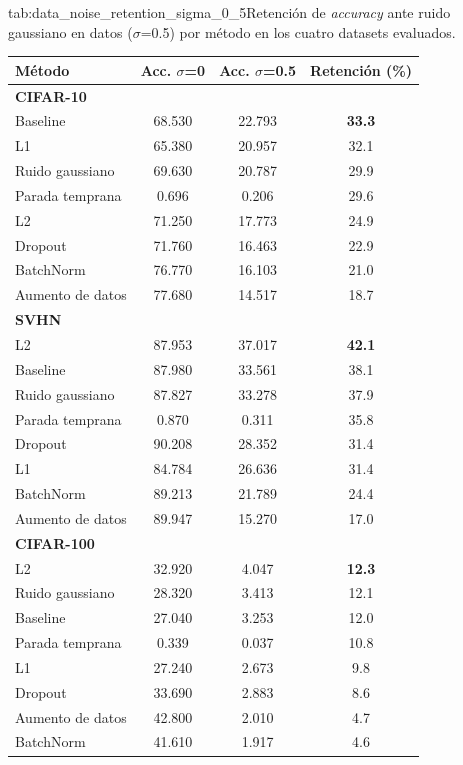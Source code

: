 \begin{table}{tab:data_noise_retention_sigma_0_5}{Retención de \textit{accuracy} ante ruido gaussiano en datos ($\sigma$=0.5) por método en los cuatro datasets evaluados.}
\small
\begin{tabular}{lccc}
\toprule
\textbf{Método} & \textbf{Acc. $\sigma$=0} & \textbf{Acc. $\sigma$=0.5} & \textbf{Retención (\%)} \\
\midrule
\multicolumn{4}{l}{\textbf{CIFAR-10}}\\
\midrule
Baseline & 68.530 & 22.793 & \textbf{33.3} \\
L1 & 65.380 & 20.957 & 32.1 \\
Ruido gaussiano & 69.630 & 20.787 & 29.9 \\
Parada temprana & 0.696 & 0.206 & 29.6 \\
L2 & 71.250 & 17.773 & 24.9 \\
Dropout & 71.760 & 16.463 & 22.9 \\
BatchNorm & 76.770 & 16.103 & 21.0 \\
Aumento de datos & 77.680 & 14.517 & 18.7 \\
\midrule
\multicolumn{4}{l}{\textbf{SVHN}}\\
\midrule
L2 & 87.953 & 37.017 & \textbf{42.1} \\
Baseline & 87.980 & 33.561 & 38.1 \\
Ruido gaussiano & 87.827 & 33.278 & 37.9 \\
Parada temprana & 0.870 & 0.311 & 35.8 \\
Dropout & 90.208 & 28.352 & 31.4 \\
L1 & 84.784 & 26.636 & 31.4 \\
BatchNorm & 89.213 & 21.789 & 24.4 \\
Aumento de datos & 89.947 & 15.270 & 17.0 \\
\midrule
\multicolumn{4}{l}{\textbf{CIFAR-100}}\\
\midrule
L2 & 32.920 & 4.047 & \textbf{12.3} \\
Ruido gaussiano & 28.320 & 3.413 & 12.1 \\
Baseline & 27.040 & 3.253 & 12.0 \\
Parada temprana & 0.339 & 0.037 & 10.8 \\
L1 & 27.240 & 2.673 & 9.8 \\
Dropout & 33.690 & 2.883 & 8.6 \\
Aumento de datos & 42.800 & 2.010 & 4.7 \\
BatchNorm & 41.610 & 1.917 & 4.6 \\

\end{tabular}
\end{table}
